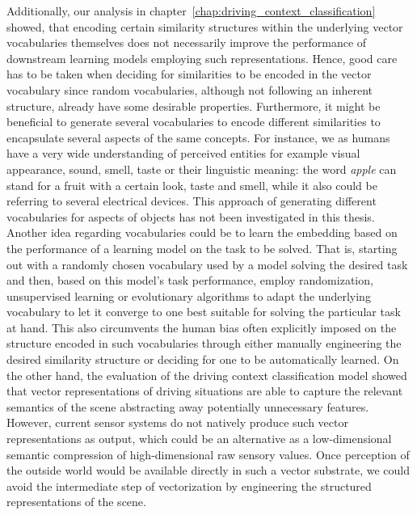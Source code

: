 Additionally, our analysis in chapter~\ref{chap:driving_context_classification} showed, that encoding certain similarity structures within the underlying vector vocabularies themselves does not necessarily improve the performance of downstream learning models employing such representations.
Hence, good care has to be taken when deciding for similarities to be encoded in the vector vocabulary since random vocabularies, although not following an inherent structure, already have some desirable properties.
Furthermore, it might be beneficial to generate several vocabularies to encode different similarities to encapsulate several aspects of the same concepts.
For instance, we as humans have a very wide understanding of perceived entities for example visual appearance, sound, smell, taste or their linguistic meaning: the word \emph{apple} can stand for a fruit with a certain look, taste and smell, while it also could be referring to several electrical devices.
This approach of generating different vocabularies for aspects of objects has not been investigated in this thesis.
Another idea regarding vocabularies could be to learn the embedding based on the performance of a learning model on the task to be solved.
That is, starting out with a randomly chosen vocabulary used by a model solving the desired task and then, based on this model's task performance, employ randomization, unsupervised learning or evolutionary algorithms to adapt the underlying vocabulary to let it converge to one best suitable for solving the particular task at hand. 
This also circumvents the human bias often explicitly imposed on the structure encoded in such vocabularies through either manually engineering the desired similarity structure or deciding for one to be automatically learned.
On the other hand, the evaluation of the driving context classification model showed that vector representations of driving situations are able to capture the relevant semantics of the scene abstracting away potentially unnecessary features.
However, current sensor systems do not natively produce such vector representations as output, which could be an alternative as a low-dimensional semantic compression of high-dimensional raw sensory values.
Once perception of the outside world would be available directly in such a vector substrate, we could avoid the intermediate step of vectorization by engineering the structured representations of the scene.

